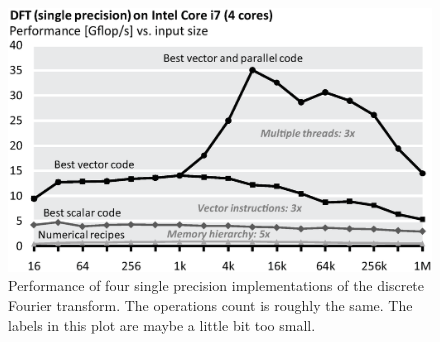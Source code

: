   \begin{figure}\centering
    \includegraphics[scale=0.33]{./03_results/figs/dft-performance.eps}
    \caption{Performance of four single precision implementations of the
    discrete Fourier transform. The operations count is roughly the
    same. The labels in this plot are maybe a little bit too small.\label{fftperf}}
  \end{figure}

